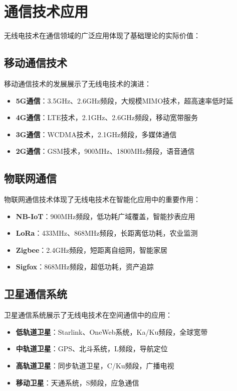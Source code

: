 \documentclass[12pt,UTF8]{ctexbook}
\begin{document}
\section{通信技术应用}

无线电技术在通信领域的广泛应用体现了基础理论的实际价值：

\subsection{移动通信技术}

移动通信技术的发展展示了无线电技术的演进：

\begin{itemize}[leftmargin=3.5em]
    \item \textbf{5G通信}：3.5GHz、2.6GHz频段，大规模MIMO技术，超高速率低时延
    \item \textbf{4G通信}：LTE技术，2.1GHz、2.6GHz频段，移动宽带服务
    \item \textbf{3G通信}：WCDMA技术，2.1GHz频段，多媒体通信
    \item \textbf{2G通信}：GSM技术，900MHz、1800MHz频段，语音通信
\end{itemize}

\subsection{物联网通信}

物联网通信技术体现了无线电技术在智能化应用中的重要作用：

\begin{itemize}[leftmargin=3.5em]
    \item \textbf{NB-IoT}：900MHz频段，低功耗广域覆盖，智能抄表应用
    \item \textbf{LoRa}：433MHz、868MHz频段，长距离低功耗，农业监测
    \item \textbf{Zigbee}：2.4GHz频段，短距离自组网，智能家居
    \item \textbf{Sigfox}：868MHz频段，超低功耗，资产追踪
\end{itemize}

\subsection{卫星通信系统}

卫星通信系统展示了无线电技术在空间通信中的应用：

\begin{itemize}[leftmargin=3.5em]
    \item \textbf{低轨道卫星}：Starlink、OneWeb系统，Ka/Ku频段，全球宽带
    \item \textbf{中轨道卫星}：GPS、北斗系统，L频段，导航定位
    \item \textbf{高轨道卫星}：同步轨道卫星，C/Ku频段，广播电视
    \item \textbf{移动卫星}：天通系统，S频段，应急通信
\end{itemize}
\end{document}
